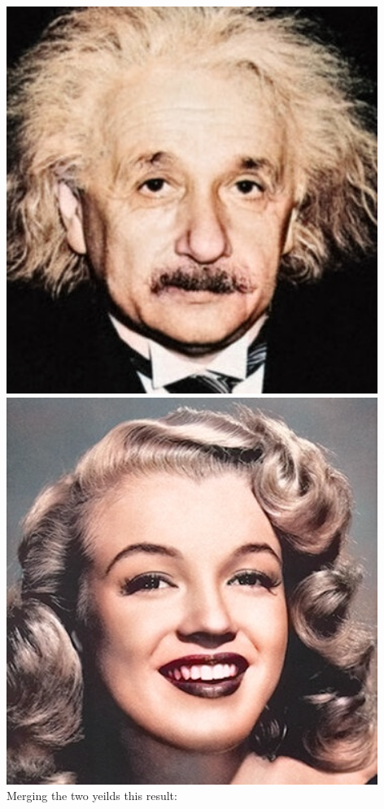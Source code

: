 \documentclass[notitlepage]{article}
\begin{document}
\includegraphics[width=4.75in]{../assets/images/rgb_einstein.png}
\\
\includegraphics[width=4.75in]{../assets/images/rgb_monroe.png}
\\
Merging the two yeilds this result:
\\
\end{document}
